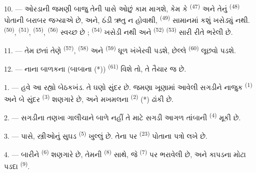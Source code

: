 10. --- ઓરડાની જમણી બાજુ તેની પાસે ઓછું કામ માગશે, કેમ કે
 \textsuperscript{(47)} અને તેનું
 \textsuperscript{(48)} પોતાની બરાબર જગ્યાએ છે, અને, ઠંડી
ઋતુ ન હોવાથી,  \textsuperscript{(49)} સામાનમાં કશું
ખસેડ્યું નથી.  \textsuperscript{(50)},  \textsuperscript{(51)}, 
\textsuperscript{(55)},  \textsuperscript{(56)} સ્વચ્છ
છે ;  \textsuperscript{(54)} ખસેડી નથી અને
 \textsuperscript{(52)} 
\textsuperscript{(53)} સારી રીતે ભરેલી છે.



11. --- તેમ છતાં તેણે 
\textsuperscript{(57)},  \textsuperscript{(58)}
અને  \textsuperscript{(59)} ધૂળ ખંખેરવી પડશે,
છેલ્લે  \textsuperscript{(60)} લૂછવો પડશે.

12. --- નાના બાળકના (બાબાના (*))  \textsuperscript{(61)}
વિશે તો, તે તૈયાર જ છે.

\VUsaut{5.0mm}
\VUsaut{3.0mm}

1. --- હવે આ રહ્યો બેઠકખંડ. તે ઘણો સુંદર  છે. જમણા
ખૂણામાં આવેલી સગડીને નાજુક  \textsuperscript{(1)}
અને બે સુંદર  \textsuperscript{(3)} શણગારે છે, અને
મખમલના  \textsuperscript{(2)} (*) ઢાંકી છે.

2. --- સગડીના તણખા ગાલીચાને બાળે નહીં તે માટે સગડી આગળ તાંબાની
 \textsuperscript{(4)} મૂકી છે.

3. --- પાસે, સ્ત્રીઓનું સુઘડ  \textsuperscript{(5)}
ખુલ્લું છે. તેના પર  \textsuperscript{(23)}
પોતાના પત્રો લખે છે.

4. --- બારીને  \textsuperscript{(6)} શણગારે છે,
તેમની  \textsuperscript{(8)} સાથે, જે 
\textsuperscript{(7)} પર ભરાવેલી છે, અને કાપડના મોટા પડદા  \textsuperscript{(9)}.


